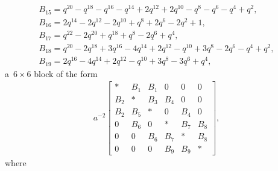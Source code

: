 \documentclass[pdftex]{sigma}
\numberwithin{equation}{section}
\theoremstyle{definition}
\newcommand{\flac}[2]{#1}
\begin{document}
\begin{gather*}
 B_{15} =
\flac{q^{20}}{a^2}-\flac{q^{18}}{a^2}-\flac{q^{16}}{a^2}-\flac{q^{14}}{a^2}+\flac{2q^{12}}{a^2}+\flac{2q^{10}}{a^2}-\flac{q^{8}}{a^2}-\flac{q^{6}}{a^2}-\flac{q^{4}}{a^2}+\flac{q^{2}}{a^2}, \\
 B_{16} =
\flac{2q^{14}}{a^2}-\flac{2q^{12}}{a^2}-\flac{2q^{10}}{a^2}+\flac{q^{8}}{a^2}+\flac{2q^{6}}{a^2}-\flac{2q^{2}}{a^2}+\flac{1}{a^2}, \\
 B_{17} =
\flac{q^{22}}{a^2}-\flac{2q^{20}}{a^2}+\flac{q^{18}}{a^2}+\flac{q^{8}}{a^2}-\flac{2q^{6}}{a^2}+\flac{q^{4}}{a^2}, \\
 B_{18} =
\flac{q^{20}}{a^2}-\flac{2q^{18}}{a^2}+\flac{3q^{16}}{a^2}-\flac{4q^{14}}{a^2}+\flac{2q^{12}}{a^2}-\flac{q^{10}}{a^2}+\flac{3q^{8}}{a^2}-\flac{2q^{6}}{a^2}-\flac{q^{4}}{a^2}+\flac{q^{2}}{a^2}, \\
 B_{19} =
\flac{2q^{16}}{a^2}-\flac{4q^{14}}{a^2}+\flac{2q^{12}}{a^2}-\flac{q^{10}}{a^2}+\flac{3q^{8}}{a^2}-\flac{3q^{6}}{a^2}+\flac{q^{4}}{a^2},
\end{gather*}
a~$6 \times 6$ block of the form
\begin{align*}
a^{-2}
 \begin{bmatrix}
 * & B_1 & B_1 & 0 & 0 & 0 \\
 B_2 & * & B_3 & B_4 & 0 & 0 \\
 B_2 & B_5 & * & 0 & B_4 & 0 \\
 0 & B_6 & 0 & * & B_7 & B_8 \\
 0 & 0 & B_6 & B_7 & * & B_8 \\
 0 & 0 & 0 & B_9 & B_9 & *
 \end{bmatrix},
\end{align*}
where
\end{document}
